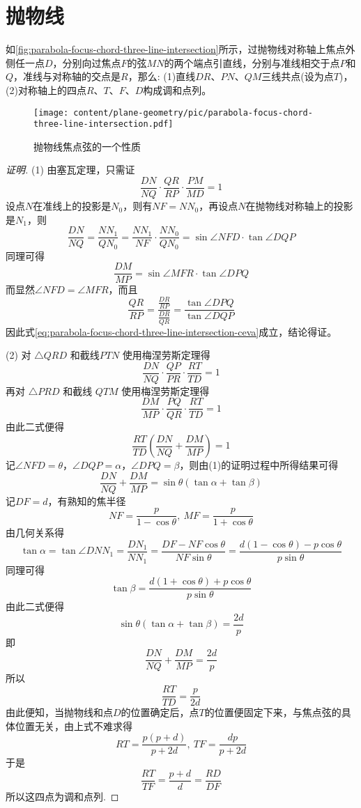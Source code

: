 
\section{抛物线}
\label{sec:para-curve}

\begin{property}
  如\autoref{fig:parabola-focus-chord-three-line-intersection}所示，过抛物线对称轴上焦点外侧任一点$D$，分别向过焦点$F$的弦$MN$的两个端点引直线，分别与准线相交于点$P$和$Q$，准线与对称轴的交点是$R$，那么: (1)直线$DR$、$PN$、$QM$三线共点(设为点$T$)，(2)对称轴上的四点$R$、$T$、$F$、$D$构成调和点列。
\end{property}

\begin{figure}[htbp]
  \centering
\texttt{[image: content/plane-geometry/pic/parabola-focus-chord-three-line-intersection.pdf]}
\caption{抛物线焦点弦的一个性质}
\label{fig:parabola-focus-chord-three-line-intersection}
\end{figure}

\begin{proof}[证明]
  (1) 由塞瓦定理，只需证
  \begin{equation}
    \label{eq:parabola-focus-chord-three-line-intersection-ceva}
  \frac{DN}{NQ} \cdot \frac{QR}{RP} \cdot \frac{PM}{MD} = 1 
  \end{equation}
  设点$N$在准线上的投影是$N_0$，则有$NF=NN_0$，再设点$N$在抛物线对称轴上的投影是$N_1$，则
  \[ \frac{DN}{NQ} = \frac{NN_1}{QN_0} = \frac{NN_1}{NF} \cdot \frac{NN_0}{QN_0} = \sin{\angle NFD} \cdot \tan{\angle DQP} \]
  同理可得
  \[ \frac{DM}{MP} = \sin{\angle MFR} \cdot \tan{\angle DPQ} \]
  而显然$\angle NFD = \angle MFR$，而且
  \[ \frac{QR}{RP} = \frac{\frac{DR}{RP}}{\frac{DR}{QR}} = \frac{\tan{\angle DPQ}}{\tan{\angle DQP}} \]
  因此式\ref{eq:parabola-focus-chord-three-line-intersection-ceva}成立，结论得证。

  (2) 对 $\triangle QRD$ 和截线$PTN$ 使用梅涅劳斯定理得
  \[ \frac{DN}{NQ} \cdot \frac{QP}{PR} \cdot \frac{RT}{TD} = 1 \]
  再对 $\triangle PRD$ 和截线 $QTM$ 使用梅涅劳斯定理得
  \[ \frac{DM}{MP} \cdot \frac{PQ}{QR} \cdot \frac{RT}{TD} = 1 \]
  由此二式便得
  \[ \frac{RT}{TD} \left( \frac{DN}{NQ} + \frac{DM}{MP} \right) = 1 \]
  记$\angle NFD=\theta$，$\angle DQP=\alpha$，$\angle DPQ=\beta$，则由(1)的证明过程中所得结果可得
  \[ \frac{DN}{NQ} + \frac{DM}{MP} = \sin{\theta} (\tan{\alpha} + \tan{\beta}) \]
  记$DF=d$，有熟知的焦半径
  \[ NF=\frac{p}{1-\cos{\theta}}, \  MF = \frac{p}{1+\cos{\theta}} \]
  由几何关系得
  \[ \tan{\alpha} = \tan{\angle DNN_1} = \frac{DN_1}{NN_1} = \frac{DF-NF\cos{\theta}}{NF \sin{\theta}} = \frac{d(1-\cos{\theta})-p\cos{\theta}}{p\sin{\theta}} \]
  同理可得
  \[ \tan{\beta} = \frac{d(1+\cos{\theta})+p\cos{\theta}}{p\sin{\theta}} \]
  由此二式便得
  \[ \sin{\theta}(\tan{\alpha} + \tan{\beta}) = \frac{2d}{p} \]
  即
  \[ \frac{DN}{NQ} + \frac{DM}{MP} = \frac{2d}{p} \]
  所以
  \[ \frac{RT}{TD} = \frac{p}{2d} \]
  由此便知，当抛物线和点$D$的位置确定后，点$T$的位置便固定下来，与焦点弦的具体位置无关，由上式不难求得
  \[ RT = \frac{p(p+d)}{p+2d}, \  TF=\frac{dp}{p+2d} \]
  于是
  \[ \frac{RT}{TF} = \frac{p+d}{d} = \frac{RD}{DF} \]
  所以这四点为调和点列.
\end{proof}

